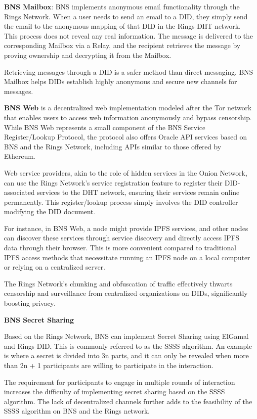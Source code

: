 \documentclass[twocolumn]{article}
\begin{document}
\textbf{BNS Mailbox}: BNS implements anonymous email functionality through the Rings Network. When a user needs to send an email to a DID, they simply send the email to the anonymous mapping of that DID in the Rings DHT network. This process does not reveal any real information. The message is delivered to the corresponding Mailbox via a Relay, and the recipient retrieves the message by proving ownership and decrypting it from the Mailbox.

Retrieving messages through a DID is a safer method than direct messaging. BNS Mailbox helps DIDs establish highly anonymous and secure new channels for messages.

\textbf{BNS Web} is a decentralized web implementation modeled after the Tor network that enables users to access web information anonymously and bypass censorship. While BNS Web represents a small component of the BNS Service Register/Lookup Protocol, the protocol also offers Oracle API services based on BNS and the Rings Network, including APIs similar to those offered by Ethereum\cite{Ethereum}.

Web service providers, akin to the role of hidden services in the Onion Network, can use the Rings Network's service registration feature to register their DID-associated services to the DHT network, ensuring their services remain online permanently. This register/lookup process simply involves the DID controller modifying the DID document.

For instance, in BNS Web, a node might provide IPFS\cite{IPFS} services, and other nodes can discover these services through service discovery and directly access IPFS data through their browser. This is more convenient compared to traditional IPFS access methods that necessitate running an IPFS node on a local computer or relying on a centralized server.

The Rings Network's chunking and obfuscation of traffic effectively thwarts censorship and surveillance from centralized organizations on DIDs, significantly boosting privacy.

\textbf{BNS Secret Sharing}

Based on the Rings Network, BNS can implement Secret Sharing using ElGamal\cite{ElGamalEncryption} and Rings DID. This is commonly referred to as the SSSS algorithm. An example is where a secret is divided into 3n parts, and it can only be revealed when more than 2n + 1 participants are willing to participate in the interaction.

The requirement for participants to engage in multiple rounds of interaction increases the difficulty of implementing secret sharing based on the SSSS algorithm. The lack of decentralized channels further adds to the feasibility of the SSSS algorithm on BNS and the Rings network.
\end{document}
